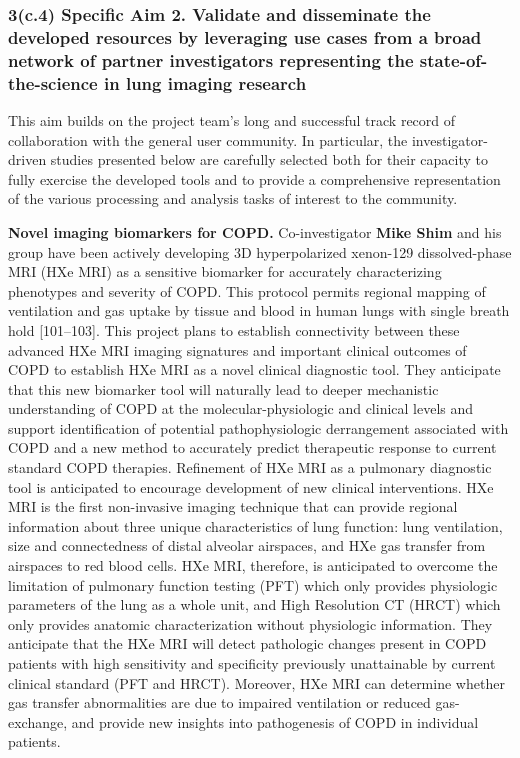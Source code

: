 \documentclass[11pt,]{article}
\begin{document}
\subsubsection{3(c.4) \textbf{Specific Aim 2.} Validate and disseminate
the developed resources by leveraging use cases from a broad network of
partner investigators representing the state-of-the-science in lung
imaging
research}\label{c.4-specific-aim-2.-validate-and-disseminate-the-developed-resources-by-leveraging-use-cases-from-a-broad-network-of-partner-investigators-representing-the-state-of-the-science-in-lung-imaging-research}

This aim builds on the project team's long and successful track record
of collaboration with the general user community. In particular, the
investigator-driven studies presented below are carefully selected both
for their capacity to fully exercise the developed tools and to provide
a comprehensive representation of the various processing and analysis
tasks of interest to the community.

\textbf{Novel imaging biomarkers for COPD.} Co-investigator \textbf{Mike
Shim} and his group have been actively developing 3D hyperpolarized
xenon-129 dissolved-phase MRI (HXe MRI) as a sensitive biomarker for
accurately characterizing phenotypes and severity of COPD. This protocol
permits regional mapping of ventilation and gas uptake by tissue and
blood in human lungs with single breath hold {[}101--103{]}. This
project plans to establish connectivity between these advanced HXe MRI
imaging signatures and important clinical outcomes of COPD to establish
HXe MRI as a novel clinical diagnostic tool. They anticipate that this
new biomarker tool will naturally lead to deeper mechanistic
understanding of COPD at the molecular-physiologic and clinical levels
and support identification of potential pathophysiologic derrangement
associated with COPD and a new method to accurately predict therapeutic
response to current standard COPD therapies. Refinement of HXe MRI as a
pulmonary diagnostic tool is anticipated to encourage development of new
clinical interventions. HXe MRI is the first non-invasive imaging
technique that can provide regional information about three unique
characteristics of lung function: lung ventilation, size and
connectedness of distal alveolar airspaces, and HXe gas transfer from
airspaces to red blood cells. HXe MRI, therefore, is anticipated to
overcome the limitation of pulmonary function testing (PFT) which only
provides physiologic parameters of the lung as a whole unit, and High
Resolution CT (HRCT) which only provides anatomic characterization
without physiologic information. They anticipate that the HXe MRI will
detect pathologic changes present in COPD patients with high sensitivity
and specificity previously unattainable by current clinical standard
(PFT and HRCT). Moreover, HXe MRI can determine whether gas transfer
abnormalities are due to impaired ventilation or reduced gas-exchange,
and provide new insights into pathogenesis of COPD in individual
patients.
\end{document}
